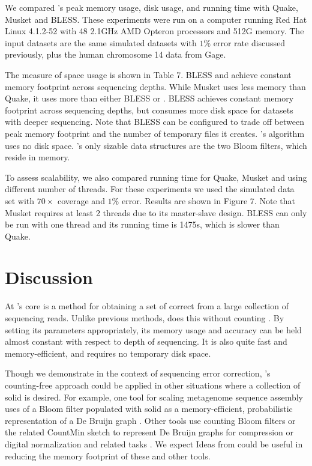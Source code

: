 \documentclass{bmcart}
\begin{document}
We compared \tool's peak memory usage, disk usage, and running time with Quake, Musket and BLESS.  These experiments were run on a computer running Red Hat Linux 4.1.2-52 with 48 2.1GHz AMD Opteron processors and 512G memory.
The input datasets are the same simulated \ecoli datasets with $1\%$ error rate discussed previously, plus the human chromosome 14 data from Gage.

The measure of space usage is shown in Table 7. BLESS and \tool achieve constant memory footprint across sequencing depths.  While Musket uses less memory than Quake, it uses more than either BLESS or \tool.  BLESS achieves constant memory footprint across sequencing depths, but consumes more disk space for datasets with deeper sequencing.  Note that BLESS can be configured to trade off between peak memory footprint and the number of temporary files it creates.  \tool's algorithm uses no disk space.  \tool's only sizable data structures are the two Bloom filters, which reside in memory.

To assess scalability, we also compared running time for Quake, Musket and \tool using different number of threads.  For these experiments we used the simulated \ecoli data set with $70\times$ coverage and $1\%$ error.  Results are shown in Figure 7.  Note that Musket requires at least 2 threads due to its master-slave design.  BLESS can only be run with one thread and its running time is 1475s, which is slower than Quake.


\section*{Discussion}
At \tool's core is a method for obtaining a set of correct \kmers from a large collection of sequencing reads.
Unlike previous methods, \tool does this without counting \kmers.
By setting its parameters appropriately, its memory usage and accuracy can be held almost constant with respect to depth of sequencing.
It is also quite fast and memory-efficient, and requires no temporary disk space.

Though we demonstrate \tool in the context of sequencing error correction, \tool's counting-free approach could be applied in other situations where a collection of solid \kmers is desired.
For example, one tool for scaling metagenome sequence assembly uses of a Bloom filter populated with solid \kmers as a memory-efficient, probabilistic representation of a De Bruijn graph \cite{pell2012scaling}.
Other tools use counting Bloom filters \cite{fan2000summary, bonomi2006improved} or the related CountMin sketch \cite{cormode2005improved} to represent De Bruijn graphs for compression \cite{jones2012compression} or digital normalization and related tasks \cite{zhang2013these}.
We expect Ideas from \tool could be useful in reducing the memory footprint of these and other tools.
\end{document}

